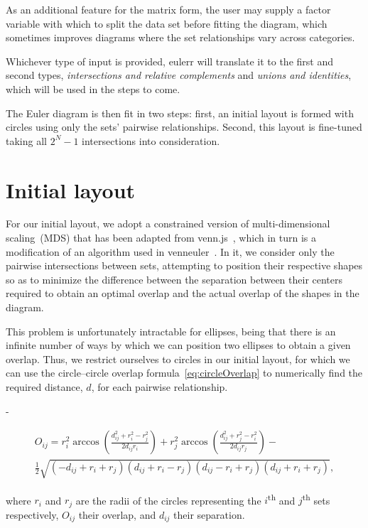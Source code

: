 \documentclass[
  oneside,
  openany,
  numbers=noendperiod,
  parskip=half,
  bibliography=totoc
]{scrbook}\usepackage[]{graphicx}\usepackage{xcolor}
\newlength{\overhang}
\newenvironment{fullwidth}{%
  \blockmargin
  \begin{addmargin*}[0em]{-\overhang}%
}{%
  \end{addmargin*}%
  \unblockmargin
}
\newcommand{\pkg}[1]{{\fontseries{b}\selectfont #1}}
\let\ts\textsuperscript
\begin{document}
As an additional feature for the matrix form, the user may supply a factor
variable with which to split the data set before fitting the diagram,
which sometimes improves diagrams where the set relationships vary
across categories.

Whichever type of input is provided, \pkg{eulerr} will translate it to the first
and second types, \emph{intersections and relative complements} and
\emph{unions and identities}, which will be used in the steps to come.

The Euler diagram is then fit in two
steps: first, an initial layout is formed with circles using only the
sets' pairwise relationships. Second, this layout is fine-tuned taking
all $2^N-1$ intersections into consideration.

\section{Initial layout}
\label{sec:initConfig}

For our initial layout, we adopt a constrained version of
multi-dimensional scaling~(MDS) that has been adapted from
\pkg{venn.js}~\citep{Frederickson_2016}, which in turn is a modification of
an algorithm used in \pkg{venneuler}~\citep{Wilkinson_2012}.
In it, we consider only the pairwise intersections between sets, attempting to
position their respective shapes so as to minimize the difference between the
separation between their centers
required to obtain an optimal overlap
and the actual overlap of the shapes in the diagram.

This problem is unfortunately intractable for ellipses, being that there is an
infinite number of ways by which we can position two ellipses to obtain a given
overlap. Thus, we restrict ourselves to circles in our initial layout, for which we can use the
circle--circle overlap formula~\eqref{eq:circleOverlap} to numerically find the
required distance, $d$, for each pairwise relationship.
\begin{fullwidth}
\begin{multline}
O_{ij} = r_i^2\arccos\left(\frac{d_{ij}^2 + r_i^2 - r_j^2}{2d_{ij}r_i}\right) +
r_j^2\arccos\left(\frac{d_{ij}^2 + r_j^2 - r_i^2}{2d_{ij}r_j}\right) - \\
\frac{1}{2}\sqrt{(-d_{ij} + r_i + r_j)(d_{ij} + r_i - r_j)(d_{ij} - r_i + r_j)(d_{ij} + r_i + r_j)},
\label{eq:circleOverlap}
\end{multline}
\end{fullwidth}
where $r_i$ and $r_j$ are the radii of the circles representing the $i$\ts{th} and
$j$\ts{th} sets respectively, $O_{ij}$ their overlap, and $d_{ij}$ their separation.
\end{document}
